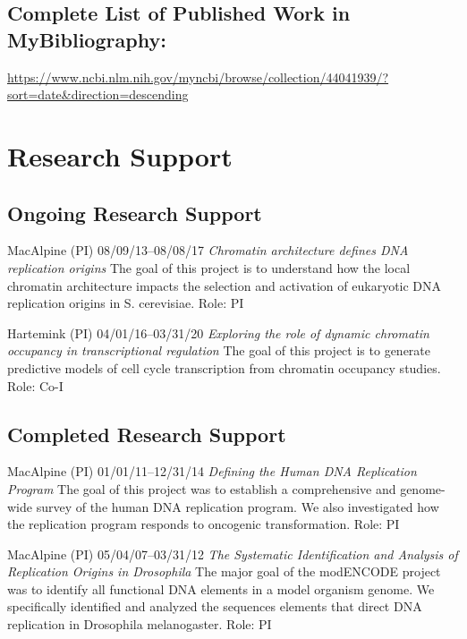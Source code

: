 \documentclass{nihbiosketch}
\begin{document}
\subsection*{Complete List of Published Work in MyBibliography:} 

\url{https://www.ncbi.nlm.nih.gov/myncbi/browse/collection/44041939/?sort=date&direction=descending}



\section{Research Support}

\subsection*{Ongoing Research Support}
\medskip

{MacAlpine (PI)}
{08/09/13--08/08/17}
{\it Chromatin architecture defines DNA replication origins}
{The goal of this project is to understand how the local chromatin architecture impacts the selection and activation of eukaryotic DNA replication origins in S. cerevisiae.}
{Role: PI}

\bigskip

{Hartemink (PI)}
{04/01/16--03/31/20}
{\it Exploring the role of dynamic chromatin occupancy in transcriptional regulation}
{The goal of this project is to generate predictive models of cell cycle transcription from chromatin occupancy studies.}
{Role: Co-I}

\bigskip



\subsection*{Completed Research Support}
\medskip

{MacAlpine (PI)}
{01/01/11--12/31/14}
{\it Defining the Human DNA Replication Program}
{The goal of this project was to establish a comprehensive and genome-wide survey of the human DNA replication program.  We also investigated how the replication program responds to oncogenic transformation.}
{Role: PI}

\bigskip

{MacAlpine (PI)}
{05/04/07--03/31/12}
{\it The Systematic Identification and Analysis of Replication Origins in Drosophila}
{The major goal of the modENCODE project was to identify all functional DNA elements in a model organism genome.  We  specifically identified and analyzed the sequences elements that direct DNA replication in Drosophila melanogaster.}
{Role: PI}
\end{document}
